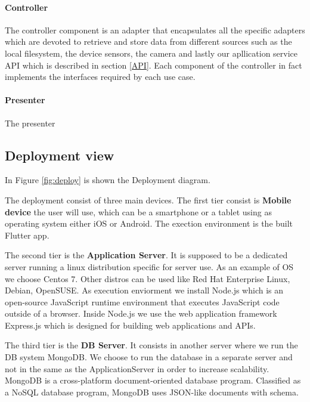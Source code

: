 \paragraph{Controller}

The controller component is an adapter that encapsulates all the specific adapters which are devoted to retrieve and store data from different sources such as the local filesystem, the device sensors, the camera and lastly our apllication service API which is described in section \ref{API}.
Each component of the controller in fact implements the interfaces required by each use case.


\paragraph{Presenter}
The presenter












\subsection{Deployment view}

In Figure \ref{fig:deploy} is shown the Deployment diagram.

The deployment consist of three main devices. The first tier consist is \textbf{Mobile device} the user will use, which can be a smartphone or a tablet using as operating system either iOS or Android.
The exection environment is the built Flutter app.


The second tier is the \textbf{Application Server}. It is supposed to be a dedicated server running a linux distribution specific for server use. As an example of OS we choose Centos 7. Other distros can be used like Red Hat Enterprise Linux, Debian, OpenSUSE.
As execution enviorment we install Node.js which is an open-source JavaScript runtime environment that executes JavaScript code outside of a browser. Inside Node.js we use the web application framework Express.js which is designed for building web applications and APIs.


The third tier is the \textbf{DB Server}. It consists in another server where we run the DB system MongoDB. We choose to run the database in a separate server and not in the same as the ApplicationServer in order to increase scalability. MongoDB is a cross-platform document-oriented database program. Classified as a NoSQL database program, MongoDB uses JSON-like documents with schema.



